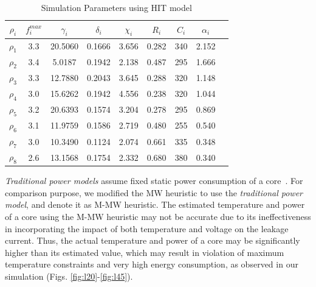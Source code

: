 \documentclass[conference]{IEEEtran}
\begin{document}
        
\vspace{-0.1in}
\begin{table}[!h!tbs]
\caption{Simulation Parameters using HIT model} 
\vspace{-0.1in}
\begin{center}
        \begin{tabular}{|c|c|c|c|c|c|c|c|c|}
        \hline
        $\rho_i$ & $f^{max}_i$ & $\gamma_i$ & $\delta_i$ & $\chi_i$ & $R_i$ & $C_i$ & $\alpha_i$  \\[0.5ex]
        \hline
        \hline $\rho_1$ & 3.3 & 20.5060 & 0.1666 & 3.656 & 0.282 & 340 & 2.152 \\
        \hline $\rho_2$ & 3.4 & 5.0187 & 0.1942 & 2.138 & 0.487 & 295 & 1.666 \\
        \hline $\rho_3$ & 3.3 & 12.7880 & 0.2043 & 3.645 & 0.288 & 320 & 1.148 \\
        \hline $\rho_4$ & 3.0 & 15.6262 & 0.1942 & 4.556 & 0.238 & 320 & 1.044 \\
        \hline $\rho_5$ & 3.2 & 20.6393 & 0.1574 & 3.204 & 0.278 & 295 & 0.869 \\
        \hline $\rho_6$ & 3.1 & 11.9759 & 0.1586 & 2.719 & 0.480 & 255 & 0.540 \\
        \hline $\rho_7$ & 3.0 & 10.3490 & 0.1124 & 2.074 & 0.661 & 335 & 0.348 \\
        \hline $\rho_8$ & 2.6 & 13.1568 & 0.1754 & 2.332 & 0.680 & 380 & 0.340 \\
        \hline
        \end{tabular}
\vspace{-0.1in}
\label{tab:simple}
\end{center}
\end{table}
\vspace{-0.1in}

  

\emph{Traditional power models} assume fixed static power 
consumption of a core~\cite{Chen09}.   
For comparison purpose, we modified the MW heuristic to use the \emph{traditional power model}, and denote it as M-MW heuristic.
The estimated temperature and power of a core using the M-MW heuristic may not be accurate due to its ineffectiveness in incorporating the impact of both temperature and voltage on the leakage current. 
Thus, the actual temperature and power of a core may be significantly higher than its estimated value, which may result in violation of maximum temperature constraints and very high energy consumption, as observed in our simulation (Figs. \ref{fig:l20}-\ref{fig:l45}).  
\end{document}

